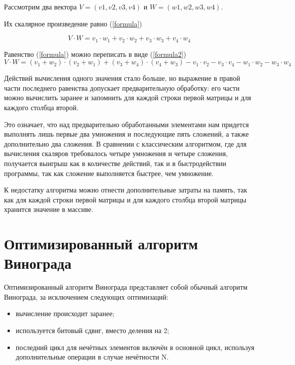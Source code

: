 Рассмотрим два вектора $V = (v1, v2, v3, v4)$ и $W = (w1, w2, w3, w4)$.  

Их скалярное произведение равно (\ref{formula}) 

\begin{equation} \label{formula}
	V \cdot W=v_1 \cdot w_1 + v_2 \cdot w_2 + v_3 \cdot w_3 + v_4 \cdot w_4
\end{equation}

Равенство (\ref{formula}) можно переписать в виде (\ref{formula2}) 
\begin{equation} \label{formula2}
	V \cdot W=(v_1 + w_2) \cdot (v_2 + w_1) + (v_3 + w_4) \cdot (v_4 + w_3) - v_1 \cdot v_2 - v_3 \cdot v_4 - w_1 \cdot w_2 - w_3 \cdot w_4
\end{equation}

Действий вычисления одного значения стало больше, но выражение в правой части последнего равенства допускает предварительную обработку:
его части можно вычислить заранее и запомнить для каждой строки первой матрицы и для каждого столбца второй.

Это означает, что над предварительно обработанными элементами нам придется выполнять лишь первые два умножения и последующие пять сложений, а также дополнительно два сложения. В сравнении с классическим алгоритмом, где для вычисления скаляров требовалось четыре умножения и четыре сложения, получается выигрыш как
в количестве действий, так и в быстродействии программы, так как сложение выполняется быстрее, чем умножение.

К недостатку алгоритма можно отнести дополнительные затраты на память, так как для каждой строки первой матрицы 
и для каждого столбца второй матрицы хранится значение в массиве.

\section{Оптимизированный алгоритм Винограда}
Оптимизированный алгоритм Винограда представляет собой обычный алгоритм Винограда, за исключением следующих оптимизаций:
\begin{itemize}
	\item вычисление происходит заранее;
	\item используется битовый сдвиг, вместо деления на 2;
	\item последний цикл для нечётных элементов включён в основной цикл, используя дополнительные операции в случае нечётности N.
\end{itemize}

